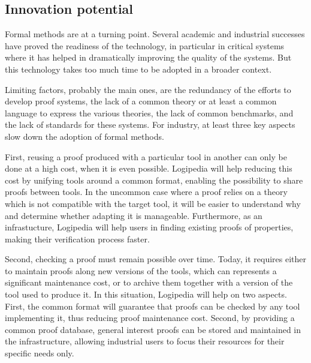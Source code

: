 \subsection*{Innovation potential}

Formal methods are at a turning point. Several academic and
industrial successes have proved the readiness of the technology,
in particular in critical systems where it has helped in
dramatically improving the quality of the systems. But this
technology takes too much time to be adopted in a broader context.

Limiting factors, probably the main ones, are the redundancy of the
efforts to develop proof systems, the lack of a common theory or at
least a common language to express the various theories, the lack of
common benchmarks, and the lack of standards for these systems.  For
industry, at least three key aspects slow down the adoption of formal
methods.

First, reusing a proof produced with a particular tool in another
can only be done at a high cost, when it is even possible.
Logipedia will help reducing this cost by unifying tools
around a common format, enabling the possibility to share proofs
between tools. In the uncommon case where a proof relies on a theory
which is not compatible with the target tool, it will be easier to
understand why and determine whether adapting it is manageable.
Furthermore, as an infrastucture, Logipedia will help users
in finding existing proofs of properties, making their verification
process faster.

Second, checking a proof must remain possible over time. Today, it
requires either to maintain proofs along new versions of the tools,
which can represents a significant maintenance cost, or to archive
them together with a version of the tool used to produce it. In this
situation, Logipedia will help on two aspects. First, the
common format will guarantee that proofs can be checked by any tool
implementing it, thus reducing proof maintenance cost. Second, by
providing a common proof database, general interest proofs can be
stored and maintained in the infrastructure, allowing industrial users
to focus their resources for their specific needs only.

